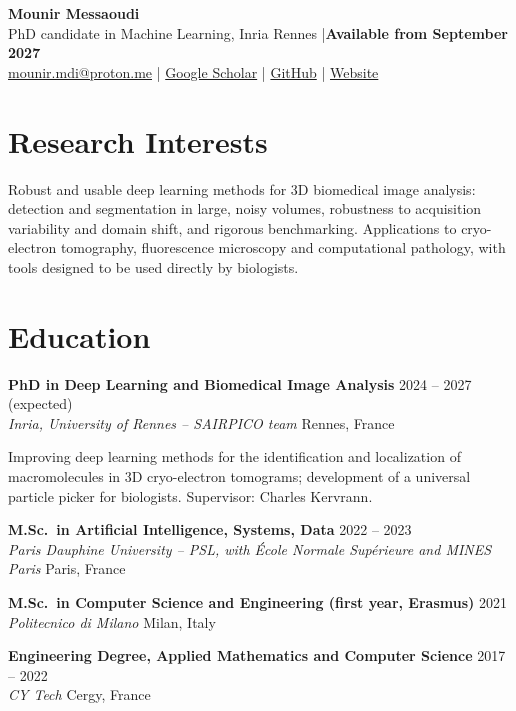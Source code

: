\documentclass[10pt,a4paper]{article}
\newcommand{\entry}[4]{%
  \textbf{#1} \hfill #2\\
  \textit{#3} \hfill #4\par\vspace{1pt}}
\begin{document}
\begin{center}
  {\LARGE\bfseries Mounir Messaoudi}\\[4pt]
  PhD candidate in Machine Learning, Inria Rennes \quad|\quad \textbf{Available from September 2027}\\[4pt]
  \href{mailto:mounir.mdi@proton.me}{mounir.mdi@proton.me} \quad|\quad
  \href{https://scholar.google.com/citations?user=E_fav18AAAAJ&hl=fr}{Google Scholar} \quad|\quad
  \href{https://github.com/MounirMessaoudi}{GitHub} \quad|\quad
  \href{https://mounirmessaoudi.github.io/}{Website}
\end{center}

\section{Research Interests}

Robust and usable deep learning methods for 3D biomedical image analysis: detection and segmentation in large, noisy volumes, robustness to acquisition variability and domain shift, and rigorous benchmarking. Applications to cryo-electron tomography, fluorescence microscopy and computational pathology, with tools designed to be used directly by biologists.

\section{Education}

\entry{PhD in Deep Learning and Biomedical Image Analysis}{2024 -- 2027 (expected)}
  {Inria, University of Rennes -- SAIRPICO team}{Rennes, France}
Improving deep learning methods for the identification and localization of macromolecules in 3D cryo-electron tomograms; development of a universal particle picker for biologists. Supervisor: Charles Kervrann.

\vspace{6pt}
\entry{M.Sc.\ in Artificial Intelligence, Systems, Data}{2022 -- 2023}
  {Paris Dauphine University -- PSL, with \'Ecole Normale Sup\'erieure and MINES Paris}{Paris, France}

\vspace{6pt}
\entry{M.Sc.\ in Computer Science and Engineering (first year, Erasmus)}{2021}
  {Politecnico di Milano}{Milan, Italy}

\vspace{6pt}
\entry{Engineering Degree, Applied Mathematics and Computer Science}{2017 -- 2022}
  {CY Tech}{Cergy, France}
\end{document}
